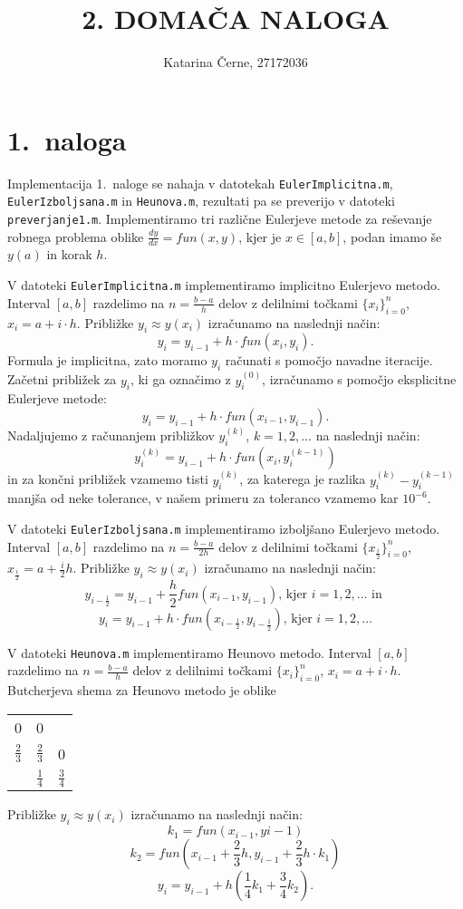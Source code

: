 \documentclass[a4paper,12pt]{article}
\begin{document}
\title{2. DOMAČA NALOGA}
\author{Katarina Černe, 27172036}
\maketitle

\section*{1.\ naloga}

Implementacija 1.\ naloge se nahaja v datotekah \texttt{EulerImplicitna.m}, \texttt{EulerIzboljsana.m} in \texttt{Heunova.m}, rezultati pa se preverijo v datoteki \texttt{preverjanje1.m}.
Implementiramo tri različne Eulerjeve metode za reševanje robnega problema oblike 
\(\frac{dy}{dx}=fun(x,y)\), kjer je \(x\in [a,b]\), podan imamo še \(y(a)\) in korak \(h\).

V datoteki \texttt{EulerImplicitna.m} implementiramo implicitno Eulerjevo metodo.
Interval \([a,b]\) razdelimo na \(n=\frac{b-a}{h}\) delov z delilnimi
točkami \(\{x_i\}_{i=0}^{n}\), \(x_i=a+i\cdot h\). Približke \(y_i\approx y(x_i)\)
izračunamo na naslednji način: 
\[y_i=y_{i-1}+h\cdot fun(x_i,y_i).\]
Formula je implicitna, zato moramo $y_i$ računati s pomočjo navadne
iteracije. Začetni približek za $y_i$, ki ga označimo z $y_i^{(0)}$,
izračunamo s pomočjo eksplicitne Eulerjeve metode:
$$y_i=y_{i-1}+h\cdot fun(x_{i-1},y_{i-1}).$$
Nadaljujemo z računanjem približkov $y_i^{(k)}$, $k=1,2,\ldots$
na naslednji način:
$$y_i^{(k)}=y_{i-1}+h\cdot fun(x_i,y_i^{(k-1)})$$
in za končni približek vzamemo tisti $y_i^{(k)}$, za katerega je
razlika $y_i^{(k)}-y_i^{(k-1)}$ manjša od neke tolerance, v našem 
primeru za toleranco vzamemo kar $10^{-6}$.

V datoteki \texttt{EulerIzboljsana.m} implementiramo izboljšano
Eulerjevo metodo. Interval $[a,b]$ razdelimo na $n=\frac{b-a}{2h}$
delov z delilnimi točkami $\{x_{\frac{i}{2}}\}_{i=0}^n$,
$x_{\frac{i}{2}}=a+\frac{i}{2}h$.  Približke \(y_i\approx y(x_i)\)
izračunamo na naslednji način:
$$y_{i-\frac{1}{2}}=y_{i-1}+\frac{h}{2}fun(x_{i-1},y_{i-1})\textrm{, kjer }
i=1,2,\ldots \textrm{ in }$$
$$y_i = y_{i-1} + h \cdot fun(x_{i-\frac{1}{2}},y_{i-\frac{1}{2}})\textrm{, kjer }
i=1,2,\ldots$$

V datoteki \texttt{Heunova.m} implementiramo Heunovo metodo.
Interval \([a,b]\) razdelimo na \(n=\frac{b-a}{h}\) delov z delilnimi
točkami \(\{x_i\}_{i=0}^{n}\), \(x_i=a+i\cdot h\).
Butcherjeva shema za Heunovo metodo je oblike
\begin{center}
\begin{tabular}{c|cc}
0 & 0 &  \\
$\frac{2}{3}$ & $\frac{2}{3}$ & 0 \\ \hline
& $\frac{1}{4}$ & $\frac{3}{4}$ 
\end{tabular}
\end{center} 
Približke \(y_i\approx y(x_i)\) izračunamo na naslednji način:
$$k_1=fun(x_{i-1},y{i-1})$$
$$k_2=fun(x_{i-1}+\frac{2}{3}h,y_{i-1}+\frac{2}{3}h\cdot k_1)$$
$$y_i=y_{i-1}+h(\frac{1}{4}k_1+\frac{3}{4}k_2).$$
\end{document}
